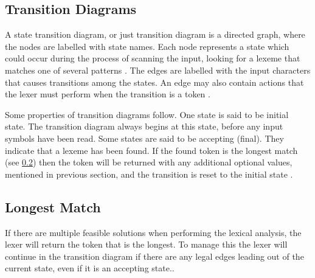 \subsection{Transition Diagrams}
A state transition diagram, or just transition diagram is a directed graph,
where the nodes are labelled with state names. Each node 
represents a state which could occur during the process of scanning the input, 
looking for a lexeme that matches one of several patterns \cite{Aho2006}. The 
edges are labelled with the input characters that causes transitions among 
the states. An edge may also contain actions that the lexer must perform when the
transition is a token \cite{sebesta2012}.

Some properties of transition diagrams
follow. One state is said to be initial state. The transition 
diagram always begins at this state, before any input symbols have been read. 
Some states are said to be accepting (final). They indicate that a lexeme has 
been found. If the found token is the longest match (see \cref{longmatch}) then the token will be 
returned with any additional optional values, mentioned in previous section, 
and the transition is reset to the initial state \cite{Aho2006}.

\subsection{Longest Match}\label{longmatch}
If there are multiple feasible solutions when performing the lexical
analysis, the lexer will return the token that is the longest. To manage this
the lexer will continue in the transition diagram if there are any legal edges
leading out of the current state, even if it is an accepting state.\cite{Aho2006}.

